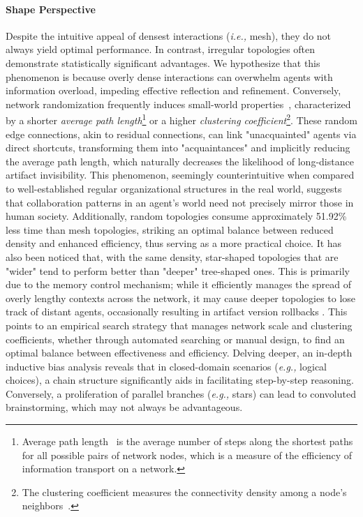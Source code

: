 \documentclass{article}
\newcommand{\ie}{\textit{i.e., }}
\newcommand{\eg}{\textit{e.g., }}
\begin{document}
\paragraph{Shape Perspective}
Despite the intuitive appeal of densest interactions (\ie mesh), they do not always yield optimal performance. In contrast, irregular topologies often demonstrate statistically significant advantages. 
We hypothesize that this phenomenon is because overly dense interactions can overwhelm agents with information overload, impeding effective reflection and refinement. Conversely, network randomization frequently induces small-world properties~\citep{Watts1998Collective}, characterized by a shorter \textit{average path length}\footnote{Average path length~\citep{Albert2001StatisticalMO} is the average number of steps along the shortest paths for all possible pairs of network nodes, which is a measure of the efficiency of information transport on a network.} or a higher \textit{clustering coefficient}\footnote{The clustering coefficient measures the connectivity density among a node's neighbors~\citep{Strogatz2001Exploring}.}.
These random edge connections, akin to residual connections, can link "unacquainted" agents via direct shortcuts, transforming them into "acquaintances" and implicitly reducing the average path length, which naturally decreases the likelihood of long-distance artifact invisibility. 
This phenomenon, seemingly counterintuitive when compared to well-established regular organizational structures in the real world, suggests that collaboration patterns in an agent's world need not precisely mirror those in human society.
Additionally, random topologies consume approximately 51.92\% less time than mesh topologies, striking an optimal balance between reduced density and enhanced efficiency, thus serving as a more practical choice.
It has also been noticed that, with the same density, star-shaped topologies that are "wider" tend to perform better than "deeper" tree-shaped ones.
This is primarily due to the memory control mechanism; while it efficiently manages the spread of overly lengthy contexts across the network, it may cause deeper topologies to lose track of distant agents, occasionally resulting in artifact version rollbacks \citep{qian2023experiential}.
This points to an empirical search strategy that manages network scale and clustering coefficients, whether through automated searching or manual design, to find an optimal balance between effectiveness and efficiency.
Delving deeper, an in-depth inductive bias analysis reveals that in closed-domain scenarios (\eg logical choices), a chain structure significantly aids in facilitating step-by-step reasoning. Conversely, a proliferation of parallel branches (\eg stars) can lead to convoluted brainstorming, which may not always be advantageous.
\end{document}
